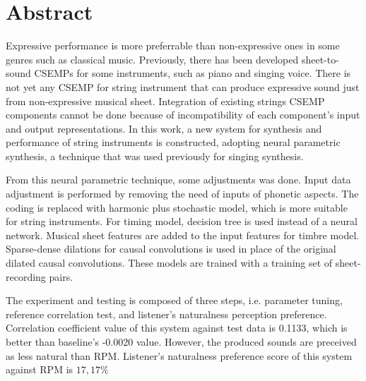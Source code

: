 \clearpage
\chapter*{Abstract}

Expressive performance is more preferrable than non-expressive ones in some genres such as classical music. Previously, there has been developed sheet-to-sound CSEMPs for some instruments, such as piano and singing voice. There is not yet any CSEMP for string instrument that can produce expressive sound just from non-expressive musical sheet. Integration of existing strings CSEMP components cannot be done because of incompatibility of each component's input and output representations. In this work, a new system for synthesis and performance of string instruments is constructed, adopting neural parametric synthesis, a technique that was used previously for singing synthesis.

From this neural parametric technique, some adjustments was done. Input data adjustment is performed by removing the need of inputs of phonetic aspects. The coding is replaced with harmonic plus stochastic model, which is more suitable for string instruments. For timing model, decision tree is used instead of a neural network. Musical sheet features are added to the input features for timbre model. Sparse-dense dilations for causal convolutions is used in place of the original dilated causal convolutions. These models are trained with a training set of sheet-recording pairs.

The experiment and testing is composed of three steps, i.e. parameter tuning, reference correlation test, and listener's naturalness perception preference. Correlation coefficient value of this system against test data is 0.1133, which is better than baseline's -0.0020 value. However, the produced sounds are preceived as less natural than RPM. Listener's naturalness preference score of this system against RPM is $17,17\%$

\clearpage